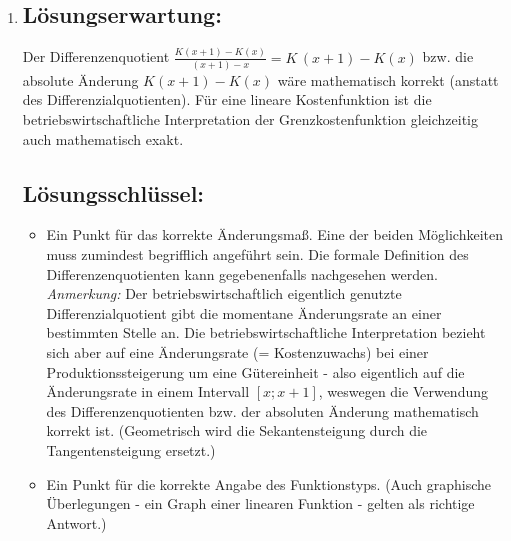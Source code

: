 \begin{langesbeispiel}
{\begin{enumerate}
	$\overline{K}=\frac{0,001\cdot x^3-0,09\cdot x^2+2,8x+5}{x}=0,001\cdot x^2-0,09\cdot x+2,8+5\cdot x^{-1}$
	
	$\overline{K}(100)=3,85$
 	
	\subsection{Lösungsschlüssel:}
	\begin{itemize}
		\item  Ein Ausgleichspunkt für die korrekte Stückkostenfunktion, wobei der Funktionsterm nicht vereinfacht werden muss. 
		\item  Ein Punkt für die korrekte Berechnung des Funktionswertes (sollte die Stückkostenfunktion zwar im Ansatz richtig, aber in der Vereinfachung fehlerhaft berechnet worden sein, jedoch der Funktionswert dann korrekt berechnet worden sein, ist dieser Punkt zu geben).
	\end{itemize}
	
	\item \subsection{Lösungserwartung:}
		Der Differenzenquotient $\frac{K(x+1)-K(x)}{(x+1)-x}=K\,(x+1)-K(x)$ bzw. die absolute Änderung $K(x+1)-K(x)$ wäre mathematisch korrekt (anstatt des Differenzialquotienten). Für eine lineare Kostenfunktion ist die betriebswirtschaftliche Interpretation der Grenzkostenfunktion gleichzeitig auch mathematisch exakt.
		
	\subsection{Lösungsschlüssel:}
	
\begin{itemize}
	\item   Ein Punkt für das korrekte Änderungsmaß. Eine der beiden Möglichkeiten muss zumindest begrifflich angeführt sein. Die formale Definition des Differenzenquotienten kann gegebenenfalls nachgesehen werden.\\ 
\textit{Anmerkung:} Der betriebswirtschaftlich eigentlich genutzte Differenzialquotient gibt die momentane Änderungsrate an einer bestimmten Stelle an. Die betriebswirtschaftliche Interpretation bezieht sich aber auf eine Änderungsrate (= Kostenzuwachs) bei einer Produktionssteigerung um eine Gütereinheit - also eigentlich auf die Änderungsrate in einem Intervall $[x; x + 1]$, weswegen die Verwendung des Differenzenquotienten bzw. der absoluten Änderung mathematisch korrekt ist. (Geometrisch wird die Sekantensteigung durch die Tangentensteigung ersetzt.)
\item  Ein Punkt für die korrekte Angabe des Funktionstyps. (Auch graphische Überlegungen - ein Graph einer linearen Funktion - gelten als richtige Antwort.)
\end{itemize}
\end{enumerate}}
		\end{langesbeispiel}